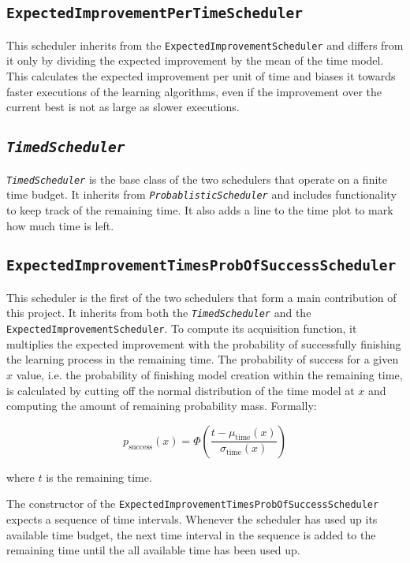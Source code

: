 \documentclass[a4paper,12pt,twoside,openright]{report}
\begin{document}
\subsection{\texttt{ExpectedImprovementPerTimeScheduler}}
This scheduler inherits from the \texttt{ExpectedImprovementScheduler} and differs from it only by dividing the expected improvement by the mean of the time model. This calculates the expected improvement per unit of time and biases it towards faster executions of the learning algorithms, even if the improvement over the current best is not as large as slower executions.

\subsection{\texttt{\textit{TimedScheduler}}}
\texttt{\textit{TimedScheduler}} is the base class of the two schedulers that operate on a finite time budget. It inherits from \texttt{\textit{ProbablisticScheduler}} and includes functionality to keep track of the remaining time. It also adds a line to the time plot to mark how much time is left.

\subsection{\texttt{ExpectedImprovementTimesProbOfSuccessScheduler}}
This scheduler is the first of the two schedulers that form a main contribution of this project. It inherits from both the \texttt{\textit{TimedScheduler}} and the \texttt{ExpectedImprovementScheduler}. To compute its acquisition function, it multiplies the expected improvement with the probability of successfully finishing the learning process in the remaining time. The probability of success for a given $x$ value, i.e. the probability of finishing model creation within the remaining time, is calculated by cutting off the normal distribution of the time model at $x$ and computing the amount of remaining probability mass. Formally:

\begin{equation}
p_{\text{success}}(x) = \Phi(\frac{t - \mu_{\text{time}}(x)}{\sigma_{\text{time}}(x)})
\end{equation}

where $t$ is the remaining time.

The constructor of the \texttt{ExpectedImprovementTimesProbOf\-Success\-Scheduler} expects a sequence of time intervals. Whenever the scheduler has used up its available time budget, the next time interval in the sequence is added to the remaining time until the all available time has been used up.
\end{document}
